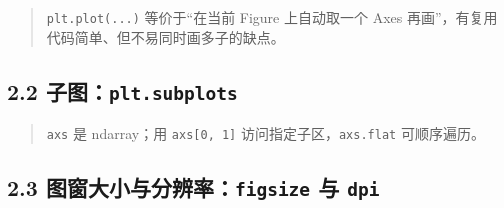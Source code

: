 \begin{Shaded}
\begin{Highlighting}[]
\end{Highlighting}
\end{Shaded}

\begin{quote}
\texttt{plt.plot(...)} 等价于``在当前 Figure 上自动取一个 Axes
再画''，有复用代码简单、但不易同时画多子的缺点。
\end{quote}

\subsection{\texorpdfstring{2.2
子图：\texttt{plt.subplots}}{2.2 子图：plt.subplots}}\label{ux5b50ux56feplt.subplots}

\begin{Shaded}
\begin{Highlighting}[]

\OperatorTok{=}\NormalTok{, }\NormalTok{)}
\NormalTok{(}
\NormalTok{(}
\NormalTok{    ax.plot([}\NormalTok{, }\NormalTok{], [}\NormalTok{, }\NormalTok{])}
\NormalTok{(}\NormalTok{)}
\end{Highlighting}
\end{Shaded}

\begin{Shaded}
\begin{Highlighting}[]
\end{Highlighting}
\end{Shaded}

\begin{quote}
\texttt{axs} 是 ndarray；用 \texttt{axs{[}0,\ 1{]}}
访问指定子区，\texttt{axs.flat} 可顺序遍历。
\end{quote}

\subsection{\texorpdfstring{2.3 图窗大小与分辨率：\texttt{figsize} 与
\texttt{dpi}}{2.3 图窗大小与分辨率：figsize 与 dpi}}\label{ux56feux7a97ux5927ux5c0fux4e0eux5206ux8fa8ux7387figsize-ux4e0e-dpi}

